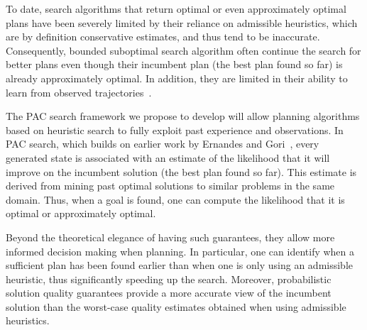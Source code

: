 \documentclass[12pt]{article}
\begin{document}


To date, search algorithms that return optimal or even approximately optimal plans have been severely limited by their reliance on admissible heuristics, which are by definition conservative estimates, and thus tend to be inaccurate. Consequently, bounded suboptimal search algorithm often continue the search for better plans even though their incumbent plan (the best plan found so far) is already approximately optimal. In addition, they are limited in their ability to learn from observed trajectories~\cite{thayer2011bounded,phillips2012graphs}.

The PAC search framework we propose to develop will allow planning algorithms based on heuristic search to fully exploit past experience and observations. In PAC search, which builds on earlier work by Ernandes and Gori~\cite{ernandes2004likely}, every generated state is associated with an estimate of the likelihood that it will improve on the incumbent solution (the best plan found so far). This estimate is derived from mining past optimal solutions to similar problems in the same domain. Thus, when a goal is found, one can compute the likelihood that it is optimal or approximately optimal. 


Beyond the theoretical elegance of having such guarantees, they allow more informed decision making when planning. In particular, one can identify when a sufficient plan has been found earlier than when one is only using an admissible heuristic, thus significantly speeding up the search. Moreover, probabilistic solution quality guarantees provide a more accurate view of the incumbent solution than the worst-case quality estimates obtained when using admissible heuristics.  
\end{document}
